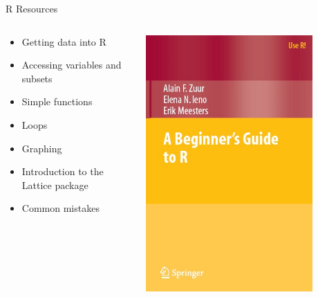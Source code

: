 \documentclass[xcolor=svgnames]{beamer}\usepackage[]{graphicx}\usepackage[]{color}
\begin{document}
\begin{frame}[t]{R Resources}
\begin{columns}
\begin{column}{0.5\textwidth}
\begin{itemize}
\item Getting data into R 
\item Accessing variables and subsets
\item Simple functions
\item Loops
\item Graphing
\item Introduction to the Lattice package
\item Common mistakes
\end{itemize}
\end{column}
\begin{column}{0.5\textwidth}
\centerline{\includegraphics[width = 0.8\textwidth]{book3.jpeg}}
\end{column}
\end{columns}
\end{frame}
\end{document}
